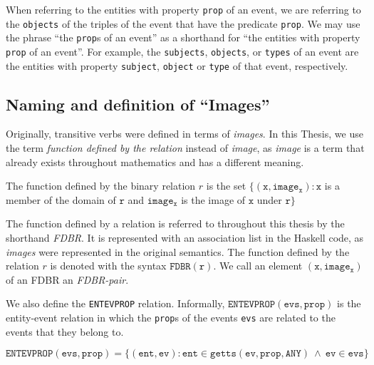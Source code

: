 \documentclass[../main.tex]{subfiles}
\begin{document}
When referring to the entities with property \texttt{prop} of an event, we are referring to the \texttt{objects} of the triples of the event that have the predicate \texttt{prop}.
We may use the phrase ``the \texttt{prop}s of an event'' as a shorthand for ``the entities with property \texttt{prop} of an event''.
For example, the \texttt{subjects}, \texttt{objects}, or \texttt{types} of an event are the entities with property \texttt{subject}, \texttt{object} or \texttt{type} of that event, respectively.

\subsection{Naming and definition of ``Images''}

Originally, transitive verbs were defined in terms of {\em images}\cite{frost2014denotational}.
In this Thesis, we use the term {\em function defined by the relation} instead of {\em image}, as {\em image} is a term that already exists throughout mathematics and has
a different meaning.

\begin{definition}
	The function defined by the binary relation $r$ is the set $\{(\mathtt{x}, \mathtt{image_x}) : \mathtt{x}$ is a member of the domain of $\mathtt{r}$ and $\mathtt{image_x}$ is the image of $\mathtt{x}$ under $\mathtt{r} \}$
\end{definition}

The function defined by a relation is referred to throughout this thesis by the shorthand {\em FDBR}.  It is represented with an association list in the Haskell code,
as {\em images} were represented in the original semantics.  The function defined by the relation $r$ is denoted with the syntax $\mathtt{FDBR}(\mathtt{r})$.
We call an element $\mathtt{(x, image_x)}$ of an FDBR an {\em FDBR-pair}.

We also define the \texttt{ENTEVPROP} relation.  Informally, $\mathtt{ENTEVPROP}(\mathtt{evs}, \mathtt{prop})$ is the entity-event relation in which the \texttt{prop}s of the events \texttt{evs} are related to the events that they belong to.

\begin{definition}
	\[\mathtt{ENTEVPROP}(\mathtt{evs}, \mathtt{prop}) = \{(\mathtt{ent}, \mathtt{ev}) : \mathtt{ent} \in \mathtt{getts}(\mathtt{ev}, \mathtt{prop}, \mathtt{ANY}) \ \wedge \ \mathtt{ev} \in \mathtt{evs} \}\]
\end{definition}
\end{document}

